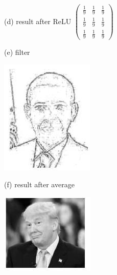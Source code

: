 \documentclass[10pt]{article}
\begin{document}
(d) result after ReLU $\left(\begin{array}{lll}\frac{1}{9} & \frac{1}{9} & \frac{1}{9} \\ \frac{1}{9} & \frac{1}{9} & \frac{1}{9} \\ \frac{1}{9} & \frac{1}{9} & \frac{1}{9}\end{array}\right)$

(e) filter

\includegraphics[max width=\textwidth]{2022_01_06_b5ce182ed1bd5f482e5bg-15(3)}

(f) result after average

\includegraphics[max width=\textwidth]{2022_01_06_b5ce182ed1bd5f482e5bg-15(4)}
\end{document}
